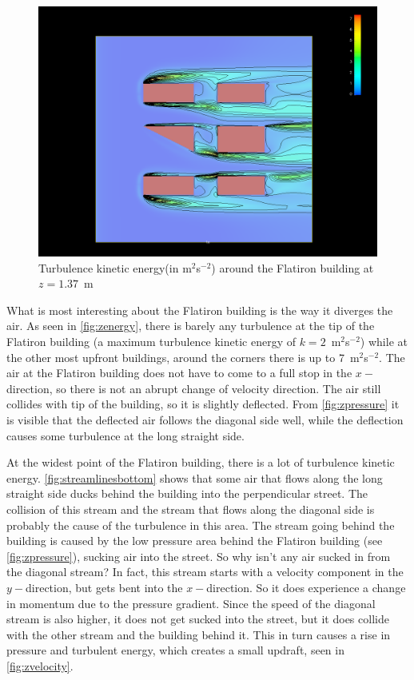 \begin{figure}[hbp!]
\centering
\includegraphics[width =  \textwidth]{zenergy.png}
\caption{Turbulence kinetic energy(in m$^2$s$^{-2}$) around the Flatiron building at $z=1.37$~m}
\label{fig:zenergy}
\end{figure}

What is most interesting about the Flatiron building is the way it diverges the air. As seen in \autoref{fig:zenergy}, there is barely any turbulence at the tip of the Flatiron building (a maximum turbulence kinetic energy of $k=2$~m$^2$s$^{-2}$) while at the other most upfront buildings, around the corners there is up to 7~m$^2$s$^{-2}$. The air at the Flatiron building does not have to come to a full stop in the $x-$direction, so there is not an abrupt change of velocity direction. The air still collides with tip of the building, so it is slightly deflected. From \autoref{fig:zpressure} it is visible that the deflected air follows the diagonal side well, while the deflection causes some turbulence at the long straight side. 

At the widest point of the Flatiron building, there is a lot of turbulence kinetic energy. \autoref{fig:streamlinesbottom} shows that some air that flows along the long straight side ducks behind the building into the perpendicular street. The collision of this stream and the stream that flows along the diagonal side is probably the cause of the turbulence in this area. The stream going behind the building is caused by the low pressure area behind the Flatiron building (see \autoref{fig:zpressure}), sucking air into the street. So why isn't any air sucked in from the diagonal stream? In fact, this stream starts with a velocity component in the $y-$direction, but gets bent into the $x-$direction. So it does experience a change in momentum due to the pressure gradient. Since the speed of the diagonal stream is also higher, it does not get sucked into the street, but it does collide with the other stream and the building behind it. This in turn causes a rise in pressure and turbulent energy, which creates a small updraft, seen in \autoref{fig:zvelocity}. 

